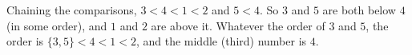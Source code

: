 Chaining the comparisons, $3<4<1<2$ and $5<4$. So $3$ and $5$ are both below $4$ (in some order), and $1$ and $2$ are above it. Whatever the order of $3$ and $5$, the order is $\{3,5\}<4<1<2$, and the middle (third) number is $\boxed{4}$.
